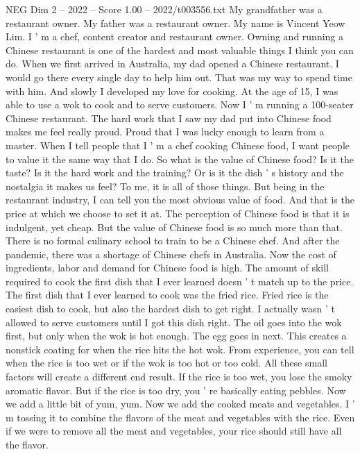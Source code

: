 \begin{textsample}{NEG Dim 2 – 2022 – Score 1.00 – 2022/t003556.txt}  \label{ex:f2_neg_067}
My grandfather was a restaurant owner.
My father was a restaurant owner.
My name is Vincent Yeow Lim.
I ' m a chef, content creator and restaurant owner.
Owning and running a Chinese restaurant is one of the hardest and most valuable things I think you can do.
When we first arrived in Australia, my dad opened a Chinese restaurant.
I would go there every single day to help him out.
That was my way to spend time with him.
And slowly I developed my love for cooking.
At the age of 15, I was able to use a wok to cook and to serve customers.
Now I ' m running a 100-seater Chinese restaurant.
The hard work that I saw my dad put into Chinese food makes me feel really proud.
Proud that I was lucky enough to learn from a master.
When I tell people that I ' m a chef cooking Chinese food, I want people to value it the same way that I do.
So what is the value of Chinese food?
Is it the taste?
Is it the hard work and the training?
Or is it the dish ' s history and the nostalgia it makes us feel?
To me, it is all of those things.
But being in the restaurant industry, I can tell you the most obvious value of food.
And that is the price at which we choose to set it at.
The perception of Chinese food is that it is indulgent, yet cheap.
But the value of Chinese food is so much more than that.
There is no formal culinary school to train to be a Chinese chef.
And after the pandemic, there was a shortage of Chinese chefs in Australia.
Now the cost of ingredients, labor and demand for Chinese food is high.
The amount of skill required to cook the first dish that I ever learned doesn ' t match up to the price.
The first dish that I ever learned to cook was the fried rice.
Fried rice is the easiest dish to cook, but also the hardest dish to get right.
I actually wasn ' t allowed to serve customers until I got this dish right.
The oil goes into the wok first, but only when the wok is hot enough.
The egg goes in next.
This creates a nonstick coating for when the rice hits the hot wok.
From experience, you can tell when the rice is too wet or if the wok is too hot or too cold.
All these small factors will create a different end result.
If the rice is too wet, you lose the smoky aromatic flavor.
But if the rice is too dry, you ' re basically eating pebbles.
Now we add a little bit of yum, yum.
Now we add the cooked meats and vegetables.
I ' m tossing it to combine the flavors of the meat and vegetables with the rice.
Even if we were to remove all the meat and vegetables, your rice should still have all the flavor.

\end{textsample}

